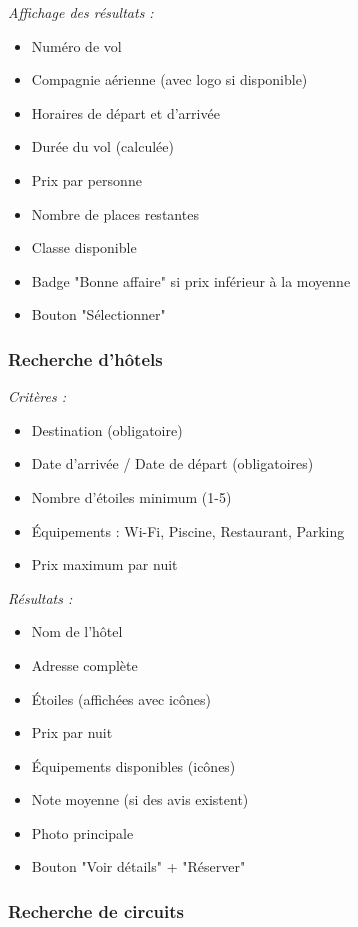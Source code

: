 \documentclass[12pt,a4paper]{report}
\begin{document}
\textit{Affichage des résultats :}
\begin{itemize}
    \item Numéro de vol
    \item Compagnie aérienne (avec logo si disponible)
    \item Horaires de départ et d'arrivée
    \item Durée du vol (calculée)
    \item Prix par personne
    \item Nombre de places restantes
    \item Classe disponible
    \item Badge "Bonne affaire" si prix inférieur à la moyenne
    \item Bouton "Sélectionner"
\end{itemize}

\subsubsection{Recherche d'hôtels}

\textit{Critères :}
\begin{itemize}
    \item Destination (obligatoire)
    \item Date d'arrivée / Date de départ (obligatoires)
    \item Nombre d'étoiles minimum (1-5)
    \item Équipements : Wi-Fi, Piscine, Restaurant, Parking
    \item Prix maximum par nuit
\end{itemize}

\textit{Résultats :}
\begin{itemize}
    \item Nom de l'hôtel
    \item Adresse complète
    \item Étoiles (affichées avec icônes)
    \item Prix par nuit
    \item Équipements disponibles (icônes)
    \item Note moyenne (si des avis existent)
    \item Photo principale
    \item Bouton "Voir détails" + "Réserver"
\end{itemize}

\subsubsection{Recherche de circuits}
\end{document}
